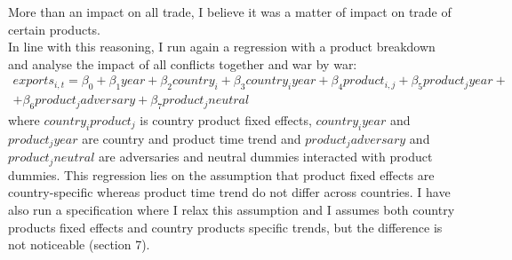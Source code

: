 \documentclass[12pt,a4paper,titlepage]{article}
\begin{document}
More than an impact on all trade, I believe it was a matter of impact on trade of certain products. \\
In line with this reasoning, I run again a regression with a product breakdown and analyse the impact of all conflicts together and war by war:
\begin{multline}
exports_{i,t}=\beta_0+\beta_1year +\beta_2country_i+\beta_3country_iyear+\beta_4product_{i,j}+\beta_5product_jyear+\\+\beta_6product_jadversary + \beta_7product_jneutral
\end{multline}
where $country_iproduct_j$ is country product fixed effects, $country_iyear$ and $product_jyear$ are country and product time trend and $product_jadversary$ and $product_jneutral$ are adversaries and neutral dummies interacted with product dummies. This regression lies on the assumption that product fixed effects are country-specific whereas product time trend do not differ across countries. I have also run a specification where I relax this assumption and I assumes both country products fixed effects and country products specific trends, but the difference is not noticeable (section 7). 
\end{document}
